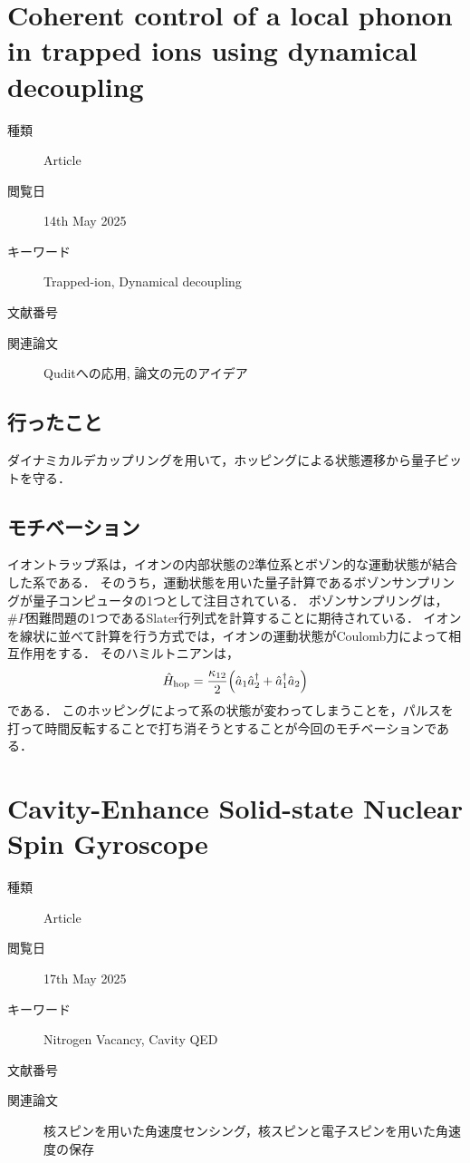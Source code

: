 \documentclass{report}
\begin{document}
  \chapter{Coherent control of a local phonon in trapped ions using dynamical decoupling}
    \begin{boxnote}
      \begin{description}
        \item[種類] Article
        \item[閲覧日] 14th May 2025
        \item[キーワード] Trapped-ion, Dynamical decoupling
        \item[文献番号] \cite{PhysRevA.106.042603}
        \item[関連論文] Quditへの応用\cite{PhysRevA.109.022620}, 論文の元のアイデア\cite{PhysRevLett.112.050504}
      \end{description}
    \end{boxnote}
    \section{行ったこと}
      ダイナミカルデカップリングを用いて，ホッピングによる状態遷移から量子ビットを守る．
    \section{モチベーション}
      イオントラップ系は，イオンの内部状態の2準位系とボゾン的な運動状態が結合した系である．
      そのうち，運動状態を用いた量子計算であるボゾンサンプリングが量子コンピュータの1つとして注目されている．
      ボゾンサンプリングは，$\# P$困難問題の1つであるSlater行列式を計算することに期待されている．
      イオンを線状に並べて計算を行う方式では，イオンの運動状態がCoulomb力によって相互作用をする．
      そのハミルトニアンは，
      \begin{align}
        \hat{H}_{\mathrm{hop}} = \frac{\kappa_{12}}{2}\qty(\hat{a}_1\hat{a}^{\dag}_2 + \hat{a}^{\dag}_1\hat{a}_2)
      \end{align}
      である．
      このホッピングによって系の状態が変わってしまうことを，パルスを打って時間反転することで打ち消そうとすることが今回のモチベーションである．
  \chapter{Cavity-Enhance Solid-state Nuclear Spin Gyroscope}
    \begin{boxnote}
      \begin{description}
        \item[種類] Article
        \item[閲覧日] 17th May 2025
        \item[キーワード] Nitrogen Vacancy, Cavity QED
        \item[文献番号] \cite{PhysRevLett.134.183603}
        \item[関連論文] 核スピンを用いた角速度センシング\cite{PhysRevA.86.062104}，核スピンと電子スピンを用いた角速度の保存\cite{wang2024spin}
      \end{description}
    \end{boxnote}
\end{document}
